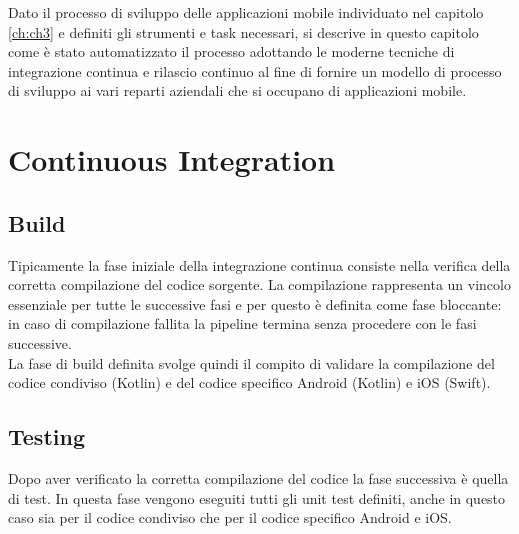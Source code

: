 
Dato il processo di sviluppo delle applicazioni mobile individuato nel capitolo \ref{ch:ch3} e definiti gli strumenti e task necessari, si descrive in questo capitolo come è stato automatizzato il processo adottando le moderne tecniche di integrazione continua e rilascio continuo al fine di fornire un modello di processo di sviluppo ai vari reparti aziendali che si occupano di applicazioni mobile.

\section{Continuous Integration}

\subsection{Build}
Tipicamente la fase iniziale della integrazione continua consiste nella verifica della corretta compilazione del codice sorgente. La compilazione rappresenta un vincolo essenziale per tutte le successive fasi e per questo è definita come fase bloccante: in caso di compilazione fallita la pipeline termina senza procedere con le fasi successive.\\
La fase di build definita svolge quindi il compito di validare la compilazione del codice condiviso (Kotlin) e del codice specifico Android (Kotlin) e iOS (Swift). 

\subsection{Testing}
Dopo aver verificato la corretta compilazione del codice la fase successiva è quella di test. In questa fase vengono eseguiti tutti gli unit test definiti, anche in questo caso sia per il codice condiviso che per il codice specifico Android e iOS.

